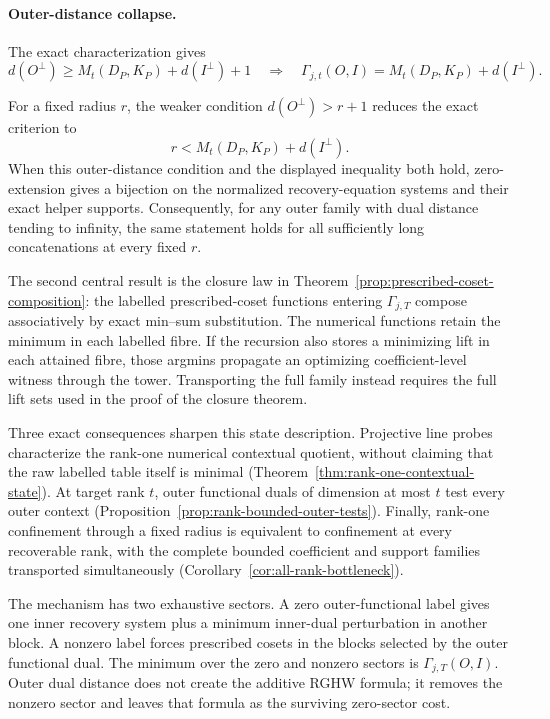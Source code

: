 \documentclass[11pt]{article}
\theoremstyle{definition}
\begin{document}
\paragraph{Outer-distance collapse.}
The exact characterization gives
\[
 d(O^\perp)\geq M_t(D_P,K_P)+d(I^\perp)+1
 \quad\Longrightarrow\quad
 \Gamma_{j,t}(O,I)=M_t(D_P,K_P)+d(I^\perp).
\]

For a fixed radius $r$, the weaker condition $d(O^\perp)>r+1$ reduces the exact
criterion to
\[
 r<M_t(D_P,K_P)+d(I^\perp).
\]
When this outer-distance condition and the displayed inequality both hold,
zero-extension gives a bijection on the normalized recovery-equation systems
and their exact helper supports.
Consequently, for any outer family with dual distance tending to infinity,
the same statement holds for all sufficiently long concatenations at every
fixed $r$.

The second central result is the closure law in
Theorem~\ref{prop:prescribed-coset-composition}: the labelled
prescribed-coset functions entering $\Gamma_{j,T}$ compose associatively by
exact min--sum substitution.  The numerical functions retain the minimum in
each labelled fibre.  If the recursion also stores a minimizing lift in each
attained fibre, those argmins propagate an optimizing coefficient-level
witness through the tower.  Transporting the full family instead requires the
full lift sets used in the proof of the closure theorem.

Three exact consequences sharpen this state description.  Projective line
probes characterize the rank-one numerical contextual quotient, without
claiming that the raw labelled table itself is minimal
(Theorem~\ref{thm:rank-one-contextual-state}).  At target rank $t$, outer
functional duals of dimension at most $t$ test every outer context
(Proposition~\ref{prop:rank-bounded-outer-tests}).  Finally, rank-one
confinement through a fixed radius is equivalent to confinement at every
recoverable rank, with the complete bounded coefficient and support families
transported simultaneously (Corollary~\ref{cor:all-rank-bottleneck}).

The mechanism has two exhaustive sectors.  A zero outer-functional label gives
one inner recovery system plus a minimum inner-dual perturbation in another
block.  A nonzero label forces prescribed cosets in the blocks selected by the
outer functional dual.  The minimum over the zero and nonzero sectors is
$\Gamma_{j,T}(O,I)$.  Outer dual
distance does not create the additive RGHW formula; it removes the nonzero
sector and leaves that formula as the surviving zero-sector cost.
\end{document}
